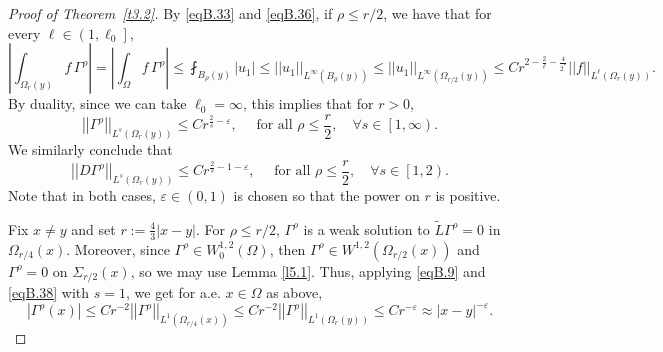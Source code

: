 \documentclass[12pt,reqno]{amsart}
\theoremstyle{plain}
\theoremstyle{definition}
\newenvironment{pf}
{\begin{proof}} {\end{proof}}
\newcommand{\eps}{\varepsilon}
\newcommand{\Ga}{\Gamma}
\newcommand{\Om}{\Omega}
\newcommand{\Si}{\Sigma}
\newcommand{\iny}{\infty}
\newcommand{\norm}[1]{\left\vert \left\vert #1\right\vert\right\vert}
\newcommand{\abs}[1]{\left\vert#1\right\vert}
\newcommand{\pr}[1]{\left( #1 \right) }
\newcommand{\pb}[1]{\left( #1 \right] }
\newcommand{\brp}[1]{\left[#1\right)}
\begin{document}
\begin{appendix}
\begin{pf}[Proof of Theorem~\ref{t3.2}]
By \eqref{eqB.33} and \eqref{eqB.36}, if $\rho \le r/2$, we have that for every $\ell \in \pb{1, \ell_0}$,
$$\abs{\int_{\Om_r\pr{y}} f \, \Ga^\rho}
= \abs{\int_\Om f \, \Ga^\rho}
\le \fint_{B_\rho(y)} \abs{u_1}
\le \norm{u_1}_{L^\infty(B_\rho(y))}
\le \norm{u_1}_{L^\infty(\Om_{r/2}(y))} 
\leq Cr^{2-\frac{2}{\ell} - \frac 4 {2^*}} \norm{f}_{L^{\ell}\pr{\Om_r\pr{y}}}.$$
By duality, since we can take $\ell_0 = \iny$, this implies that for $r > 0$,
\begin{equation}
\label{eqB.38}
\norm{\Ga^\rho}_{L^s\pr{\Om_r\pr{y}}}
\le C r^{\frac{2}{s} - \eps}, \quad \mbox{ for all } \rho \le \frac{r}{2}, \quad \forall s \in \brp{1,\iny}.
\end{equation}
We similarly conclude that
\begin{equation}
\label{eqB.39}
\norm{D\Ga^\rho}_{L^s\pr{\Om_r\pr{y}}}
\le C r^{\frac{2}{s} - 1 - \eps}, \quad \mbox{ for all } \rho \le \frac{r}{2}, \quad \forall s \in \brp{1,2}.
\end{equation}
Note that in both cases, $\eps \in \pr{0, 1}$ is chosen so that the power on $r$ is positive.

Fix $x\ne y$ and set $r:= \frac{4}{3} |x-y|$.  
For $\rho \le r/2$, $\Ga^\rho$ is a weak solution to $\widetilde{L} \Ga^\rho=0$ in $\Om_{r/4}(x)$.  
Moreover, since $\Ga^\rho \in W^{1,2}_0\pr{\Om}$, then $\Ga^\rho \in W^{1,2}\pr{\Om_{r/2}\pr{x}}$ and  $\Ga^\rho = 0$ on $\Si_{r/2}\pr{x}$, so we may use Lemma \ref{l5.1}.
Thus, applying \eqref{eqB.9} and \eqref{eqB.38} with $s=1$, we get for a.e. $x \in \Om$ as above, 
\begin{equation}
\label{eqB.40}
\abs{\Ga^\rho(x)}
\le C r^{-2} \norm{\Ga^\rho}_{L^1\pr{\Om_{r/4}\pr{x}}} 
\le C r^{-2} \norm{\Ga^\rho}_{L^1\pr{\Om_{r}\pr{y}}} 
\le Cr^{-\eps}
\approx  |x-y|^{-\eps}.
\end{equation}
 

\end{pf}
\end{appendix}
\end{document}
